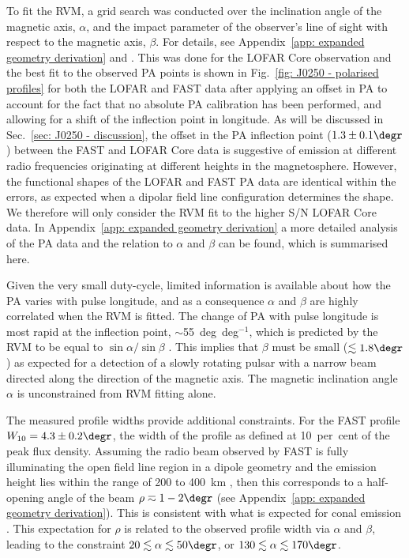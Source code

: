 To fit the RVM, a grid search was conducted over the inclination angle of the magnetic axis, $\alpha$, and the impact parameter of the observer's line of sight with respect to the magnetic axis, $\beta$. For details, see Appendix~\ref{app: expanded geometry derivation} and \citet{RWJx2015a}. This was done for the LOFAR Core observation and the best fit to the observed PA points is shown in Fig.~\ref{fig: J0250 - polarised profiles} for both the LOFAR and FAST data after applying an offset in PA to account for the fact that no absolute PA calibration has been performed, and allowing for a shift of the inflection point in longitude. As will be discussed in Sec.~\ref{sec: J0250 - discussion}, the offset in the PA inflection point ($1.3\pm0.1\degr$) between the FAST and LOFAR Core data is suggestive of emission at different radio frequencies originating at different heights in the magnetosphere. However, the functional shapes of the LOFAR and FAST PA data are identical within the errors, as expected when a dipolar field line configuration determines the shape. We therefore will only consider the RVM fit to the higher S/N LOFAR Core data. In Appendix~\ref{app: expanded geometry derivation} a more detailed analysis of the PA data and the relation to $\alpha$ and $\beta$ can be found, which is summarised here.

Given the very small duty-cycle, limited information is available about how the PA varies with pulse longitude, and as a consequence $\alpha$ and $\beta$ are highly correlated when the RVM is fitted. The change of PA with pulse longitude is most rapid at the inflection point, $\sim$55~deg~deg$^{-1}$, which is predicted by the RVM to be equal to $\sin\alpha / \sin \beta$ \citep{Kxxx1970}. This implies that $\beta$ must be small ($\lesssim1.8\degr$) as expected for a detection of a slowly rotating pulsar with a narrow beam directed along the direction of the magnetic axis. The magnetic inclination angle $\alpha$ is unconstrained from RVM fitting alone.

The measured profile widths provide additional constraints. For the FAST profile $W_{10}=4.3\pm0.2\degr$, the width of the profile as defined at 10~per~cent of the peak flux density. Assuming the radio beam observed by FAST is fully illuminating the open field line region in a dipole geometry and the emission height lies within the range of 200 to 400~km \citep[e.g.][]{MRxx2002, JKxx2019}, then this corresponds to a half-opening angle of the beam $\rho \eqsim 1 - 2\degr$ (see Appendix~\ref{app: expanded geometry derivation}). This is consistent with what is expected for conal emission \citep{Rxxx1993}. This expectation for $\rho$ is related to the observed profile width via $\alpha$ and $\beta$, leading to the constraint $20 \lesssim \alpha \lesssim 50\degr$, or $130 \lesssim \alpha \lesssim 170\degr$.

